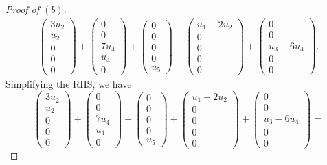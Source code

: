 \documentclass{extarticle}
\begin{document}
\begin{proof}[Proof of $(b)$]
\begin{multline*}
\begin{pmatrix} 3u_2 \\ u_2 \\ 0 \\ 0\\ 0 \end{pmatrix} + \begin{pmatrix} 0 \\ 0 \\ 7u_4 \\ u_4 \\ 0 \end{pmatrix} + \begin{pmatrix} 0 \\ 0 \\ 0 \\ 0 \\ u_5 \end{pmatrix} + \begin{pmatrix} u_1 -2u_2\\ 0 \\ 0 \\ 0 \\ 0 \end{pmatrix} + \begin{pmatrix} 0 \\ 0 \\ u_3 - 6u_4 \\ 0 \\ 0 \end{pmatrix}.
\end{multline*}
Simplifying the RHS, we have
\begin{equation*}
\begin{pmatrix} 3u_2 \\ u_2 \\ 0 \\ 0\\ 0 \end{pmatrix} + \begin{pmatrix} 0 \\ 0 \\ 7u_4 \\ u_4 \\ 0 \end{pmatrix} + \begin{pmatrix} 0 \\ 0 \\ 0 \\ 0 \\ u_5 \end{pmatrix} + \begin{pmatrix} u_1 -2u_2\\ 0 \\ 0 \\ 0 \\ 0 \end{pmatrix} + \begin{pmatrix} 0 \\ 0 \\ u_3 - 6u_4 \\ 0 \\ 0 \end{pmatrix} = 

\end{equation*}
\end{proof}
\end{document}
